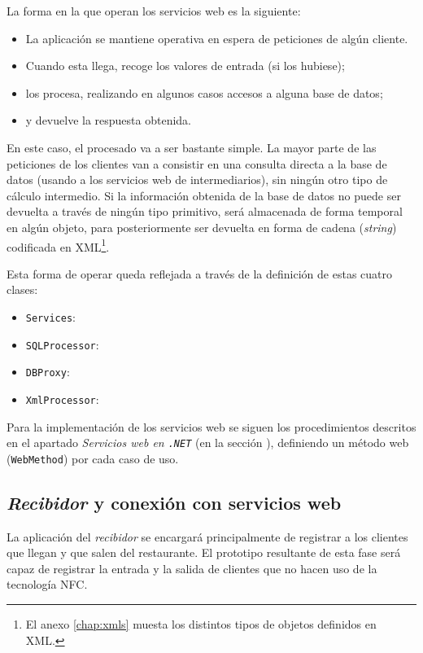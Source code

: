 La forma en la que operan los servicios web es la siguiente:
\begin{itemize}
\item La aplicación se mantiene operativa en espera de peticiones de algún
cliente.
\item Cuando esta llega, recoge los valores de entrada (si los hubiese);
\item los procesa, realizando en algunos casos accesos a alguna base de datos;
\item y devuelve la respuesta obtenida.
\end{itemize}

En este caso, el procesado va a ser bastante simple. La mayor parte de las
peticiones de los clientes van a consistir en una consulta directa a la base
de datos (usando a los servicios web de intermediarios), sin ningún otro
tipo de cálculo intermedio. Si la información obtenida de la base de datos 
no puede ser devuelta a través de ningún tipo primitivo, será almacenada de 
forma temporal en algún objeto, para posteriormente ser devuelta en forma de
cadena (\emph{string}) codificada en \acs{XML}\footnote{El anexo
\ref{chap:xmls} muesta los distintos tipos de objetos definidos en \acs{XML}.}.

Esta forma de operar queda reflejada a través de la definición de estas cuatro 
clases:
\begin{itemize}
\item \texttt{Services}:
\item \texttt{SQLProcessor}:
\item \texttt{DBProxy}:
\item \texttt{XmlProcessor}:
\end{itemize}

Para la implementación de los servicios web se siguen los procedimientos
descritos en el apartado \emph{Servicios web en \texttt{.NET}} (en la sección
\label{subsec:webServicesApp}), definiendo un método web (\texttt{WebMethod})
por cada caso de uso.

\subsection{\emph{Recibidor} y conexión con servicios web}
La aplicación del \emph{recibidor} se encargará principalmente de registrar a
los clientes que llegan y que salen del restaurante. El prototipo resultante
de esta fase será capaz de registrar la entrada y la salida de clientes que no
hacen uso de la tecnología \acs{NFC}.

